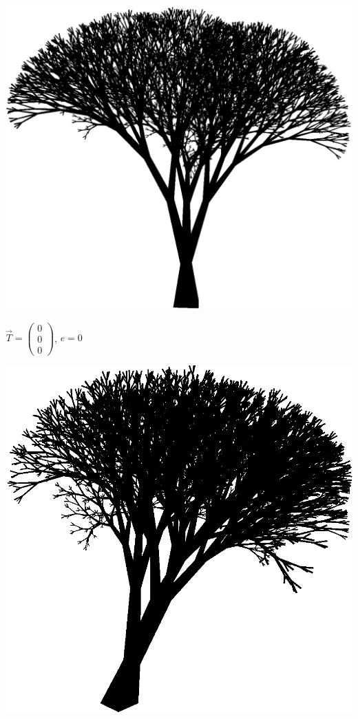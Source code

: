 \newpage
\begin{center}
	
	\begin{minipage}[c]{0.55\textwidth}
		\centering
		\includegraphics[height=.75\textheight]{images/CH2_3DTreeP61B_Angle_18_95.png}
		\vspace{0.05\textheight}
		
		$\overrightarrow{T} =\begin{pmatrix}
		0 \\ 0 \\ 0
		\end{pmatrix}$, $e = 0$
	\end{minipage}
	\begin{minipage}[c]{0.4\textwidth}
		\centering
		\includegraphics[height=.75\textheight]{images/CH2_3DTreeP61B_Angle_18_95_Tropism.png}
		\vspace{0.05\textheight}
		

\end{minipage}
\end{center}
